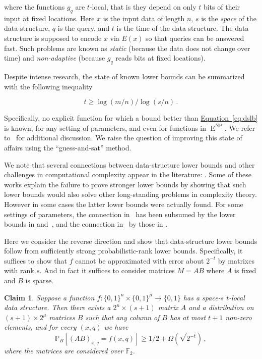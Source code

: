\documentclass[11pt]{article}
\newcommand{\expeqref}[2]{\texorpdfstring{\hyperref[#2]{#1~\eqref{#2}}}{#1~\eqref{#2}}}
\newtheorem{claim}[theorem]{Claim}
\DeclareMathOperator{\NP}{\mathrm{NP}}  %
\DeclareMathOperator{\EEE}{\mathrm{E}}  %
\newcommand{\zo}{\{0, 1\}}
\newcommand{\F}{\mathbb{F}}
\renewcommand{\P}{\mathbb{P}}
\begin{document}
where the functions $g_{q}$ are $t$-local, that is they depend on
only $t$ bits of their input at fixed locations. Here $x$ is the
input data of length $n$, $s$ is the \emph{space} of the data structure,
$q$ is the query, and $t$ is the time of the data structure. The
data structure is supposed to encode $x$ via $E(x)$ so that queries
can be answered fast. Such problems are known as \emph{static }(because
the data does not change over time) and \emph{non-adaptive} (because
$g_{q}$ reads bits at fixed locations).

Despite intense research, the state of known lower bounds can be summarized
with the following inequality

\begin{equation}
t\ge\log(m/n)/\log(s/n)\,.\label{eq:dslb}
\end{equation}

Specifically, no explicit function for which a bound better than
\expeqref{Equation}{eq:dslb}  %
is known, for any setting of parameters, and even for functions in
$\EEE^{\NP}$. We refer to~\cite{viola-datastructurelb-implies-cclb}
for additional discussion. We raise the question of improving this
state of affairs using the ``guess-and-sat'' method.

We note that several connections between data-structure lower bounds
and other challenges in computational complexity appear in the literature:
\cite{MiltersenNSW98,viola-datastructurelb-implies-cclb,DBLP:conf/stoc/DvirGW19,DBLP:journals/eccc/Corrigan-GibbsK18,DBLP:conf/innovations/RamamoorthyR20}.
Some of these works explain the failure to prove stronger lower bounds
by showing that such lower bounds would also solve other long-standing
problems in complexity theory. However in some cases the latter lower
bounds were actually found. For some settings of parameters, the connection
in~\cite{MiltersenNSW98} has been subsumed by the lower bounds in
\cite{Ajtai05} and~\cite{BSSV03}, and the connection in~\cite{DBLP:conf/stoc/DvirGW19}
by those in \cite{AlmanC19,DBLP:journals/corr/abs-2005-03123}.

Here we consider the reverse direction and show that data-structure
lower bounds follow from sufficiently strong probabilistic-rank lower
bounds. Specifically, it suffices to show that $f$ cannot be approximated
with error about $2^{-t}$ by matrixes with rank $s$. And in fact
it suffices to consider matrices $M=AB$ where $A$ is fixed and $B$
is sparse.
\begin{claim}
Suppose a function $f:\zo^{n}\times\zo^{\mu}\to\zo$ has a space-$s$
$t$-local data structure. Then there exists a $2^{n}\times(s+1)$
matrix $A$ and a distribution on $(s+1)\times2^{\mu}$ matrices $B$
such that any column of $B$ has at most $t+1$ non-zero elements,
and for every $(x,q)$ we have
\[
\P_{B}[(AB)_{x,q}=f(x,q)]\ge1/2+\Omega(\sqrt{2^{-t}})\,,
\]
where the matrices are considered over $\F_{2}$.
\end{claim}
\end{document}
